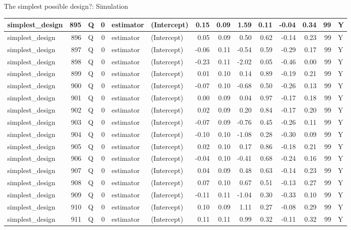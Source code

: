 \documentclass[
  11pt,
  ignorenonframetext,
]{beamer}
\begin{document}
\begin{frame}[fragile]{The simplest possible design?: Simulation}
\begin{tabular}{l|r|l|r|l|l|r|r|r|r|r|r|r|l}
\hline
simplest\_design & 895 & Q & 0 & estimator & (Intercept) & 0.15 & 0.09 & 1.59 & 0.11 & -0.04 & 0.34 & 99 & Y\\
\hline
simplest\_design & 896 & Q & 0 & estimator & (Intercept) & 0.05 & 0.09 & 0.50 & 0.62 & -0.14 & 0.23 & 99 & Y\\
\hline
simplest\_design & 897 & Q & 0 & estimator & (Intercept) & -0.06 & 0.11 & -0.54 & 0.59 & -0.29 & 0.17 & 99 & Y\\
\hline
simplest\_design & 898 & Q & 0 & estimator & (Intercept) & -0.23 & 0.11 & -2.02 & 0.05 & -0.46 & 0.00 & 99 & Y\\
\hline
simplest\_design & 899 & Q & 0 & estimator & (Intercept) & 0.01 & 0.10 & 0.14 & 0.89 & -0.19 & 0.21 & 99 & Y\\
\hline
simplest\_design & 900 & Q & 0 & estimator & (Intercept) & -0.07 & 0.10 & -0.68 & 0.50 & -0.26 & 0.13 & 99 & Y\\
\hline
simplest\_design & 901 & Q & 0 & estimator & (Intercept) & 0.00 & 0.09 & 0.04 & 0.97 & -0.17 & 0.18 & 99 & Y\\
\hline
simplest\_design & 902 & Q & 0 & estimator & (Intercept) & 0.02 & 0.09 & 0.20 & 0.84 & -0.17 & 0.20 & 99 & Y\\
\hline
simplest\_design & 903 & Q & 0 & estimator & (Intercept) & -0.07 & 0.09 & -0.76 & 0.45 & -0.26 & 0.11 & 99 & Y\\
\hline
simplest\_design & 904 & Q & 0 & estimator & (Intercept) & -0.10 & 0.10 & -1.08 & 0.28 & -0.30 & 0.09 & 99 & Y\\
\hline
simplest\_design & 905 & Q & 0 & estimator & (Intercept) & 0.02 & 0.10 & 0.17 & 0.86 & -0.18 & 0.21 & 99 & Y\\
\hline
simplest\_design & 906 & Q & 0 & estimator & (Intercept) & -0.04 & 0.10 & -0.41 & 0.68 & -0.24 & 0.16 & 99 & Y\\
\hline
simplest\_design & 907 & Q & 0 & estimator & (Intercept) & 0.04 & 0.09 & 0.48 & 0.63 & -0.14 & 0.23 & 99 & Y\\
\hline
simplest\_design & 908 & Q & 0 & estimator & (Intercept) & 0.07 & 0.10 & 0.67 & 0.51 & -0.13 & 0.27 & 99 & Y\\
\hline
simplest\_design & 909 & Q & 0 & estimator & (Intercept) & -0.11 & 0.11 & -1.04 & 0.30 & -0.33 & 0.10 & 99 & Y\\
\hline
simplest\_design & 910 & Q & 0 & estimator & (Intercept) & 0.10 & 0.09 & 1.11 & 0.27 & -0.08 & 0.29 & 99 & Y\\
\hline
simplest\_design & 911 & Q & 0 & estimator & (Intercept) & 0.11 & 0.11 & 0.99 & 0.32 & -0.11 & 0.32 & 99 & Y\\

\end{tabular}
\end{frame}
\end{document}
